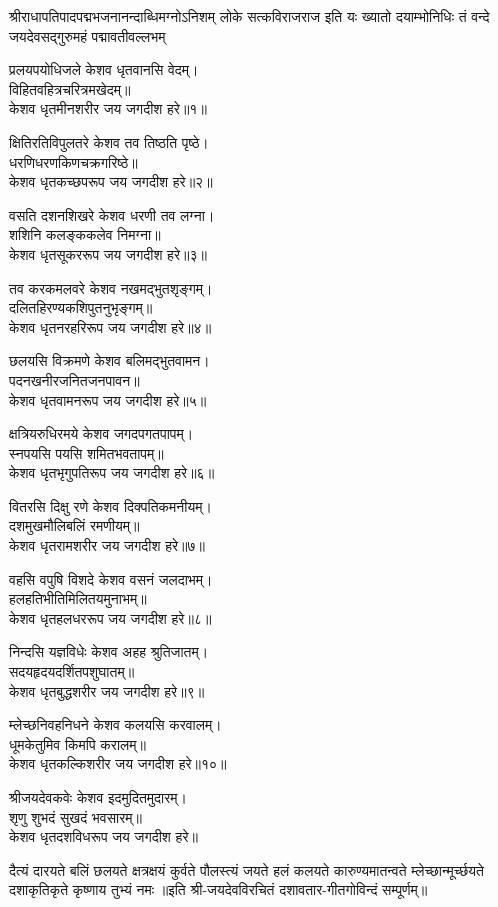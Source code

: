 
\bigskip
{}
\bigskip
{}
{श्रीराधापतिपादपद्मभजनानन्दाब्धिमग्नोऽनिशम्}
{लोके सत्कविराजराज इति यः ख्यातो दयाम्भोनिधिः}
{तं वन्दे जयदेवसद्गुरुमहं पद्मावतीवल्लभम्}

प्रलयपयोधिजले केशव धृतवानसि वेदम्।\\
विहितवहित्रचरित्रमखेदम्॥\\
केशव धृतमीनशरीर जय जगदीश हरे॥१॥

\smallskip
क्षितिरतिविपुलतरे केशव तव तिष्ठति पृष्ठे।\\
धरणिधरणकिणचक्रगरिष्ठे॥\\
केशव धृतकच्छपरूप जय जगदीश हरे॥२॥

\smallskip
वसति दशनशिखरे केशव धरणी तव लग्ना।\\
शशिनि कलङ्ककलेव निमग्ना॥\\
केशव धृतसूकररूप जय जगदीश हरे॥३॥

\smallskip
तव करकमलवरे केशव नखमद्भुतशृङ्गम्।\\
दलितहिरण्यकशिपुतनुभृङ्गम्॥\\
केशव धृतनरहरिरूप जय जगदीश हरे॥४॥

\smallskip
छलयसि विक्रमणे केशव बलिमद्भुतवामन।\\
पदनखनीरजनितजनपावन॥\\
केशव धृतवामनरूप जय जगदीश हरे॥५॥

\smallskip
क्षत्रियरुधिरमये केशव जगदपगतपापम्।\\
स्नपयसि पयसि शमितभवतापम्॥\\
केशव धृतभृगुपतिरूप जय जगदीश हरे॥६॥

\smallskip
वितरसि दिक्षु रणे केशव दिक्पतिकमनीयम्।\\
दशमुखमौलिबलिं रमणीयम्॥\\
केशव धृतरामशरीर जय जगदीश हरे॥७॥

\smallskip
वहसि वपुषि विशदे केशव वसनं जलदाभम्।\\
हलहतिभीतिमिलितयमुनाभम्॥\\
केशव धृतहलधररूप जय जगदीश हरे॥८॥

\smallskip
निन्दसि यज्ञविधेः केशव अहह श्रुतिजातम्।\\
सदयहृदयदर्शितपशुघातम्॥\\
केशव धृतबुद्धशरीर जय जगदीश हरे॥९॥

\smallskip
म्लेच्छनिवहनिधने केशव कलयसि करवालम्।\\
धूमकेतुमिव किमपि करालम्॥\\
केशव धृतकल्किशरीर जय जगदीश हरे॥१०॥

\smallskip
श्रीजयदेवकवेः केशव इदमुदितमुदारम्।\\
शृणु शुभदं सुखदं भवसारम्॥\\
केशव धृतदशविधरूप जय जगदीश हरे॥

\smallskip
{}
{दैत्यं दारयते बलिं छलयते क्षत्रक्षयं कुर्वते}
{पौलस्त्यं जयते हलं कलयते कारुण्यमातन्वते}
{म्लेच्छान्मूर्च्छयते दशाकृतिकृते कृष्णाय तुभ्यं नमः}
॥इति श्री-जयदेवविरचितं दशावतार-गीतगोविन्दं सम्पूर्णम्॥
